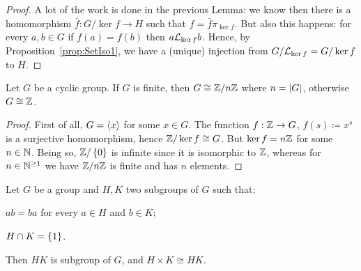 \begin{proof}
A lot of the work is done in the previous Lemma: we know then there is a homomorphism \(\bar f : G /\ker f \to H\) such that \(f = \bar f \pi_{\ker f}\). But also this happens: for every \(a, b \in G\) if \(f(a) = f(b)\) then \(a \mathcal L_{\ker f} b\). Hence, by Proposition~\ref{prop:SetIso1}, we have a (unique) injection from \(G/\mathcal L_{\ker f} = G/\ker f\) to \(H\).
\end{proof}

\begin{proposition}\label{prop:CyclicClassification}
Let \(G\) be a cyclic group. If \(G\) is finite, then \(G \cong \mathbb Z/n\mathbb Z\) where \(n = \left\lvert G\right\rvert\), otherwise \(G \cong \mathbb Z\).
\end{proposition}

\begin{proof}
First of all, \(G = \left\langle x\right\rangle\) for some \(x \in G\). The function \(f : \mathbb Z \to G\), \(f(s) \coloneq x^s\) is a surjective homomorphism, hence \(\mathbb Z/\ker f \cong G\). But \(\ker f = n\mathbb Z\) for some \(n \in \mathbb N\). Being so, \(\mathbb Z/\left\{0\right\}\) is infinite since it is isomorphic to \(\mathbb Z\), whereas for \(n \in \mathbb N^{\ge 1}\) we have \(\mathbb Z/n\mathbb Z\) is finite and has \(n\) elements.
\end{proof}

\begin{lemma}\label{lem:CartesianIso}
Let \(G\) be a group and \(H, K\) two subgroups of \(G\) such that:
\begin{tcbenum}
\item \(ab = ba\) for every \(a \in H\) and \(b \in K\);
\item \(H \cap K = \left\{1\right\}\).
\end{tcbenum}
Then \(HK\) is subgroup of \(G\), and \(H \times K \cong HK\).
\end{lemma}

